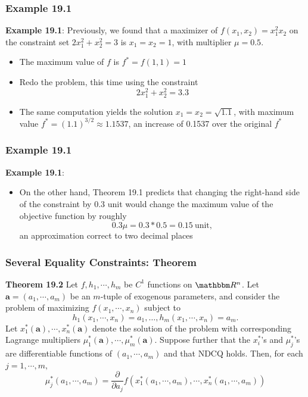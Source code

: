 \documentclass[9pt,aspectratio=169]{beamer}
\newcommand{\RR}{\mathbbm R}
\begin{document}
						
\begin{frame}
	\frametitle{Example 19.1} \textbf{Example 19.1}: Previously, we found
    that a maximizer of $f(x_1,x_2) = x_1^2x_2$ on the constraint set
    $2x_1^2+x_2^2 = 3$ is $x_1 = x_2 = 1$, with multiplier $\mu = 0.5$.
	\begin{itemize}
		\item The maximum value of $f$ is $f^* = f(1,1) = 1$
		\item Redo the problem, this time using the constraint
        $$2x_1^2+x_2^2 = 3.3$$
		\item The same computation yields the solution $x_1 = x_2 =
        \sqrt{1.1}$, with maximum value $f^* = (1.1)^{3/2} \approx 1.1537$,
        an increase of 0.1537 over the original $f^*$
	\end{itemize}
\end{frame}			
		
		
\begin{frame}
	\frametitle{Example 19.1}
	\textbf{Example 19.1}: 
	\begin{itemize}
		\item On the other hand, Theorem 19.1 predicts that changing the
        right-hand side of the constraint by 0.3 unit would change the
        maximum value of the objective function by roughly
		$$0.3\mu = 0.3*0.5 = 0.15 \ \text{unit},$$
		an approximation correct to two decimal places
	\end{itemize}
\end{frame}		
		


\begin{frame}
	\frametitle{Several Equality Constraints: Theorem}
	\begin{block}{\textbf{Theorem 19.2}}
        Let $f,h_1,\cdots,h_m$ be $C^1$ functions on $\RR^n$. Let $\mathbf{a}
        = (a_1,\cdots,a_m)$ be an $m$-tuple of exogenous parameters, and
        consider the problem of maximizing $f(x_1,\cdots,x_n)$ subject to
        \begin{equation*}
            h_1(x_1,\cdots,x_n)= a_1, \ldots, h_m(x_1,\cdots,x_n) = a_m.
        \end{equation*}
        Let $x_1^*(\mathbf{a}), \cdots, x_n^*(\mathbf{a})$ denote the
        solution of the problem with corresponding Lagrange multipliers
        $\mu_1^*(\mathbf{a}),\cdots, \mu_m^*(\mathbf{a})$. Suppose further
        that the $x_i^*$'s and $\mu_j^*$'s are differentiable functions of
        $(a_1,\cdots,a_m)$ and that NDCQ holds. Then, for each $j = 1,\cdots,
        m,$
        \begin{equation*}
            \mu_j^*(a_1,\cdots,a_m) = \frac{\partial}{\partial
              a_j}f(x_1^*(a_1,\cdots,a_m),\cdots,x_n^*(a_1,\cdots,a_m))
        \end{equation*}
	\end{block}
\end{frame}
\end{document}
